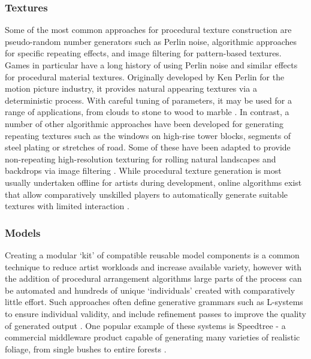 \documentclass{acm_proc_article-sp}
\begin{document}
\subsubsection{Textures}
Some of the most common approaches for procedural texture construction are pseudo-random number generators such as Perlin noise, algorithmic approaches for specific repeating effects, and image filtering for pattern-based textures.
Games in particular have a long history of using Perlin noise and similar effects for procedural material textures. Originally developed by Ken Perlin for the motion picture industry, it provides natural appearing textures via a deterministic process. With careful tuning of parameters, it may be used for a range of applications, from clouds to stone to wood to marble \cite{perlin2002improving}.
In contrast, a number of other algorithmic approaches have been developed for generating repeating textures such as the windows on high-rise tower blocks, segments of steel plating or stretches of road. Some of these have been adapted to provide non-repeating high-resolution texturing for rolling natural landscapes and backdrops via image filtering \cite{patternTextures}.
While procedural texture generation is most usually undertaken offline for artists during development, online algorithms exist that allow comparatively unskilled players to automatically generate suitable textures with limited interaction \cite{DeBry:2007:PPT:1278780.1278878}.

\subsubsection{Models}
Creating a modular `kit' of compatible reusable model components is a common technique to reduce artist workloads and increase available variety, however with the addition of procedural arrangement algorithms large parts of the process can be automated and hundreds of unique `individuals' created with comparatively little effort. Such approaches often define generative grammars such as L-systems to ensure individual validity, and include refinement passes to improve the quality of generated output \cite{dart2011speedrock}. One popular example of these systems is Speedtree - a commercial middleware product capable of generating many varieties of realistic foliage, from single bushes to entire forests \cite{speedtree}.
\end{document}
